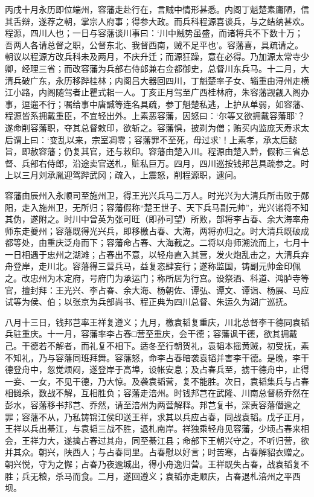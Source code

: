 \documentclass[]{article}
\begin{document}
丙戌十月永历即位端州，容藩走赴行在，言贼中情形甚悉。内阁丁魁楚素庸陋，信其舌辩，遂荐之朝，掌宗人府事；得参大政。而兵科程源喜谈兵，与之结纳甚欢。程源，四川人也；一日与容藩谈川事曰：`川中贼势虽盛，而诸将兵不下数十万；吾两人各请总督之职，公督东北、我督西南，贼不足平也'。容藩喜，具疏请之。朝议以程源方改兵科未及两月，不庆升迁；而源狂躁，意在必得。乃加源太常寺少卿，经理三省；而改容藩为兵部右侍郎兼右佥都御史，总督川东兵马。十二月，大清兵破广东，永历移跸桂林；内阁吕大器回四川，丁魁楚率子女、辎重由浔州走横江小路，内阁随驾者止瞿式耜一人。丁亥正月驾至广西桂林府，朱容藩觊觎入阁办事，逗遛不行；嘱给事中唐諴等连名具疏，参丁魁楚私逃，上护从单弱，如容藩、程源皆系拥戴重臣，不宜轻出外。上素恶容藩，因怒曰：`尔等又欲拥戴容藩耶'？遂命削容藩职，夺其总督敕印，欲斩之。容藩惧，披剃为僧；贿买内监庞天寿求太后谓上曰：`变乱以来，宗室凋零；容藩罪不至死，毋过求'！上素孝，承太后懿旨，即赦容藩；仍复其官，还与敕印。容藩由楚入川。程源由楚入黔，假称三省总督、兵部右侍郎，沿途卖官送札，赃私巨万。四月，四川巡按钱邦芑具疏参之。时上以三月刘承胤迎驾跸武冈；疏入，上震怒，削程源职，逮问。

容藩由辰州入永顺司至施州卫，得王光兴兵马二万人。时光兴为大清兵所击败于郧阳，走入施州卫，无所归；容藩假称``楚王世子、天下兵马副元帅''，光兴诸将不知其伪，遂附之。时川中曾英为张可旺（即孙可望）所败，部将李占春、余大海率舟师东走夔州；容藩既得光兴兵，即移檄占春、大海，两将亦归之。时大清兵既破成都等处，由重庆泛舟而下；容藩命占春、大海截之。二将以舟师溯流而上，七月十一日相遇于忠州之湖滩；占春出不意，以轻舟直入其营，发火炮乱击之，大清兵弃舟登岸，走川北。容藩得三营兵马，益复恣肆妄行；遂称监国，铸副元帅金印佩之。改忠州为木定府，号府门为承运门；称所居为行宫。设祭酒、科道、鸿胪寺等官，擅封拜：王光兴、李占春、余大海、杨朝佐、谭弘、谭文、谭诣、杨展、马应试等为侯、伯；以张京为兵部尚书、程正典为四川总督、朱运久为湖广巡抚。

八月十三日，钱邦芑率王祥复遵义；九月，檄袁韬复重庆，川北总督李干德同袁韬兵驻重庆。十一月，容藩率李占春□营至重庆，会干德；容藩讽干德，欲其拥戴己。干德若不解者，而礼复不相下。适冬至行朝贺礼，袁韬本摇黄贼，初受抚，素不知礼，乃与容藩同班拜舞。容藩怒，命李占春暗袭袁韬并害李干德。是晚，李干德登舟中，忽觉烦闷，遂登岸于高埠，设帐安息；及占春兵至，掳干德舟中，止得一妾、一女，不见干德，乃大惊。及袭袁韬营，复不能胜。次日，袁韬集兵与占春相雠杀，数战不解，互相胜负；容藩走涪州。时钱邦芑在武隆、川南总督杨乔然在彭水，容藩移书邦芑、乔然，请至涪州为两营解释。邦芑复书，深责容藩僭逾之罪；容藩不从，乃私铸锦江侯印送王祥，求其以兵应占春，同战袁韬。戊子正月，王祥以兵出綦江，与袁韬三战不胜，退札南岸。祥独乘轻舟见容藩，少顷占春来相会，王祥力大，遂擒占春过其舟，同至綦江县；命部下王朝兴守之，不听归营，欲并其众。朝兴，陕西人；与占春同里。占春慰以好言；时苦寒，占春解貂衣赠之。朝兴悦，守为之懈；占春乃夜逾城出，得小舟逸归营。王祥既失占春，战袁韬复不胜；兵无粮，杀马而食。二月，遂回遵义；袁韬亦走顺庆，占春退札涪州之平西坝。
\end{document}
